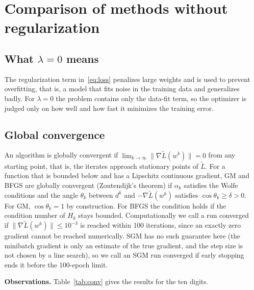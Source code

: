 \documentclass{article}
\begin{document}
\section{Comparison of methods without regularization}\label{sec:lambda0}

\subsection{What $\lambda=0$ means}
The regularization term in~\eqref{eq:loss} penalizes large weights and is used to prevent overfitting, that is, a model that fits noise in the training data and generalizes badly. For $\lambda=0$ the problem contains only the data-fit term, so the optimizer is judged only on how well and how fast it minimizes the training error.

\subsection{Global convergence}\label{sec:global}
An algorithm is globally convergent if $\lim_{k\to\infty}\|\nabla\tilde L(w^k)\|=0$ from any starting point, that is, the iterates approach stationary points of $\tilde L$. For a function that is bounded below and has a Lipschitz continuous gradient, GM and BFGS are globally convergent (Zoutendijk's theorem) if $\alpha_k$ satisfies the Wolfe conditions and the angle $\theta_k$ between $d^k$ and $-\nabla\tilde L(w^k)$ satisfies $\cos\theta_k\ge\delta>0$. For GM, $\cos\theta_k=1$ by construction. For BFGS the condition holds if the condition number of $H_k$ stays bounded. Computationally we call a run converged if $\|\nabla\tilde L(w^k)\|\le 10^{-3}$ is reached within 100 iterations, since an exactly zero gradient cannot be reached numerically. SGM has no such guarantee here (the minibatch gradient is only an estimate of the true gradient, and the step size is not chosen by a line search), so we call an SGM run converged if early stopping ends it before the 100-epoch limit.

\textbf{Observations.} Table~\ref{tab:conv} gives the results for the ten digits.
\end{document}
